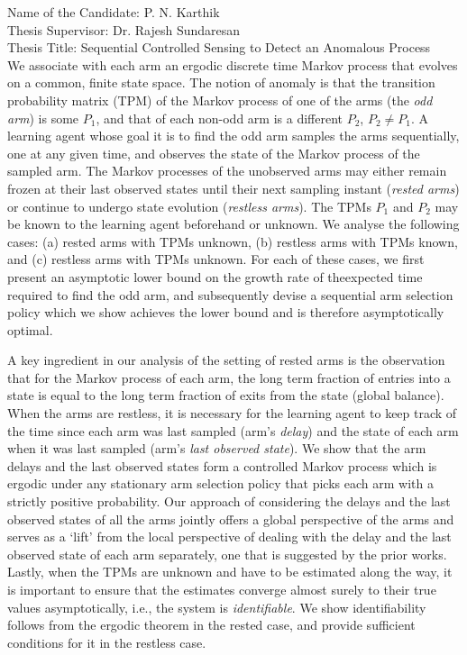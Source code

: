 \documentclass[10pt]{letter} %
\begin{document}
\begin{letter}{Name of the Candidate: P. N. Karthik\\
Thesis Supervisor: Dr. Rajesh Sundaresan\\
Thesis Title: Sequential Controlled Sensing to Detect an Anomalous Process\\
}
We associate with each arm an ergodic discrete time Markov process that evolves on a common, finite state space. The notion of anomaly is that the transition probability matrix (TPM) of the Markov process of one of the arms (the {\em odd arm}) is some $P_{1}$, and that of each non-odd arm is a different $P_{2}$, $P_{2}\neq P_{1}$. A learning agent whose goal it is to find the odd arm samples the arms sequentially, one at any given time, and observes the state of the Markov process of the sampled arm. The Markov processes of the unobserved arms may either remain frozen at their last observed states until their next sampling instant ({\em rested arms}) or continue to undergo state evolution ({\em restless arms}). The TPMs $P_{1}$ and $P_{2}$ may be known to the learning agent beforehand or unknown. We analyse the following cases: (a) rested arms with TPMs unknown, (b) restless arms with TPMs known, and (c) restless arms with TPMs unknown. For each of these cases, we first present an asymptotic lower bound on the growth rate of theexpected time required to find the odd arm, and subsequently devise a sequential arm selection policy which we show achieves the lower bound and is therefore asymptotically optimal. 

A key ingredient in our analysis of the setting of rested arms is the observation that for the Markov process of each arm, the long term fraction of entries into a state is equal to the long term fraction of exits from the state (global balance). When the arms are restless, it is necessary for the learning agent to keep track of the time since each arm was last sampled (arm's {\em delay}) and the state of each arm when it was last sampled (arm's {\em last observed state}). We show that the arm delays and the last observed states form a controlled Markov process which is ergodic under any stationary arm selection policy that picks each arm with a strictly positive probability. Our approach of considering the delays and the last observed states of all the arms jointly offers a global perspective of the arms and serves as a `lift' from the local perspective of dealing with the delay and the last observed state of each arm separately, one that is suggested by the prior works. Lastly, when the TPMs are unknown and have to be estimated along the way, it is important to ensure that the estimates converge almost surely to their true values asymptotically, i.e., the system is {\em identifiable}. We show identifiability follows from the ergodic theorem in the rested case, and provide sufficient conditions for it in the restless case.

\end{letter}
\end{document}
